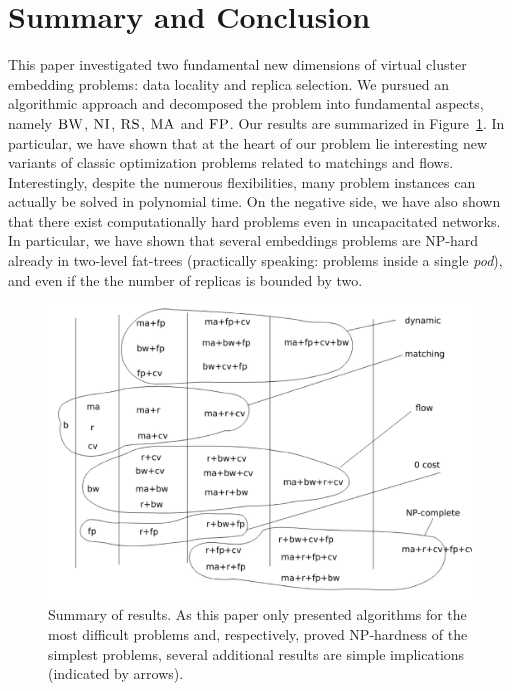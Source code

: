 \documentclass[9pt,twocolumn]{scrartcl}
\newcommand{\CC}{\textsc{NI}}
\newcommand{\FP}{\textsc{FP}}
\newcommand{\RS}{\textsc{RS}}
\newcommand{\BW}{\textsc{BW}}
\newcommand{\MA}{\textsc{MA}}
\begin{document}
\section{Summary and Conclusion}\label{sec:conclusion}

This paper investigated two fundamental new dimensions of virtual cluster
embedding problems: data locality and replica selection. We pursued
an algorithmic approach and decomposed the problem into fundamental aspects,
namely $\BW$, $\CC$, $\RS$, $\MA$ and $\FP$. Our results are summarized in
Figure~\ref{fig:summary}.
In particular, we have shown that
at the heart of our problem lie interesting new variants of classic
optimization problems related to matchings and flows. Interestingly, despite the
numerous
flexibilities, many problem instances can actually be solved in polynomial time.
On the negative side, we have also shown that there exist computationally hard
problems even in uncapacitated networks. In particular,
we have shown that several embeddings problems are NP-hard already in two-level fat-trees (practically speaking:
problems inside a single \emph{pod}), and even if the the number of replicas is bounded by two.


\begin{figure}[t]
\includegraphics[width = \columnwidth]{figs/summary}
\caption{Summary of results. As this paper only presented algorithms for the most
difficult problems and, respectively, proved NP-hardness of the simplest
problems, several additional results are simple implications (indicated by arrows).}
\label{fig:summary}
\end{figure}
\end{document}
